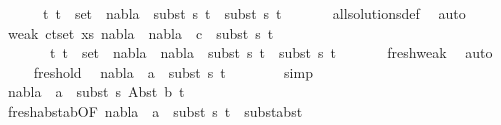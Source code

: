 \begin{isabellebody}
\ \ \ \ \ {\isachardoublequoteopen}{\isasymforall}\ {\isacharparenleft}{\kern0pt}t{}{\isacharcomma}{\kern0pt}\ t{}{\isacharparenright}{\kern0pt}\ {\isasymin}\ set\ {\isacharbrackleft}{\kern0pt}{\isacharbrackright}{\kern0pt}{\isachardot}{\kern0pt}\ nabla{}\ {\isasymturnstile}\ subst\ s{}\ t{}\ {\isasymapprox}\ subst\ s{}\ t{}{\isachardoublequoteclose}\isanewline
\ \ \ \ \ \isamarkupfalse%
\ all{\isacharunderscore}{\kern0pt}solutions{\isacharunderscore}{\kern0pt}def\ \isamarkupfalse%
\ auto\isanewline
\ \ \ \isamarkupfalse%
\ weak{}{\isacharcolon}{\kern0pt}\ {\isachardoublequoteopen}{\isasymforall}{\isacharparenleft}{\kern0pt}c{\isacharcomma}{\kern0pt}t{\isacharparenright}{\kern0pt}{\isasymin}set\ xs{\isachardot}{\kern0pt}\ {\isacharparenleft}{\kern0pt}nabla{}\ {\isasymunion}\ nabla{}{\isacharparenright}{\kern0pt}\ {\isasymturnstile}\ c\ {\isasymsharp}\ subst\ s{}\ t{\isachardoublequoteclose}\isanewline
\ \ \ \ \ \ {\isachardoublequoteopen}{\isasymforall}\ {\isacharparenleft}{\kern0pt}t{}{\isacharcomma}{\kern0pt}\ t{}{\isacharparenright}{\kern0pt}\ {\isasymin}\ set\ {\isacharbrackleft}{\kern0pt}{\isacharbrackright}{\kern0pt}{\isachardot}{\kern0pt}\ {\isacharparenleft}{\kern0pt}nabla{}\ {\isasymunion}\ nabla{}{\isacharparenright}{\kern0pt}\ {\isasymturnstile}\ subst\ s{}\ t{}\ {\isasymapprox}\ subst\ s{}\ t{}{\isachardoublequoteclose}\isanewline
\ \ \ \ \ \isamarkupfalse%
\ fresh{\isacharunderscore}{\kern0pt}weak\ \isamarkupfalse%
\ auto\isanewline
\ \ \ \isamarkupfalse%
\ fresh{\isacharunderscore}{\kern0pt}old\ \isamarkupfalse%
\ {\isachardoublequoteopen}nabla{}\ {\isasymturnstile}\ a\ {\isasymsharp}\ subst\ s{}\ t{\isacharprime}{\kern0pt}{\isachardoublequoteclose}\ \isanewline
\ \ \ \ \ \isamarkupfalse%
\ simp\isanewline
\ \ \ \isamarkupfalse%
\ {\isachardoublequoteopen}nabla{}\ {\isasymturnstile}\ a\ {\isasymsharp}\ subst\ s{}\ {\isacharparenleft}{\kern0pt}Abst\ b\ t{\isacharprime}{\kern0pt}{\isacharparenright}{\kern0pt}{\isachardoublequoteclose}\isanewline
\ \ \ \isamarkupfalse%
\ fresh{\isacharunderscore}{\kern0pt}abst{\isacharunderscore}{\kern0pt}ab{\isacharbrackleft}{\kern0pt}OF\ {\isacartoucheopen}nabla{}\ {\isasymturnstile}\ a\ {\isasymsharp}\ subst\ s{}\ t{\isacharprime}{\kern0pt}{\isacartoucheclose}\ {}{\isacharparenleft}{\kern0pt}{}{\isacharparenright}{\kern0pt}{\isacharbrackright}{\kern0pt}\ subst{\isacharunderscore}{\kern0pt}abst\ \isamarkupfalse%

\end{isabellebody}
